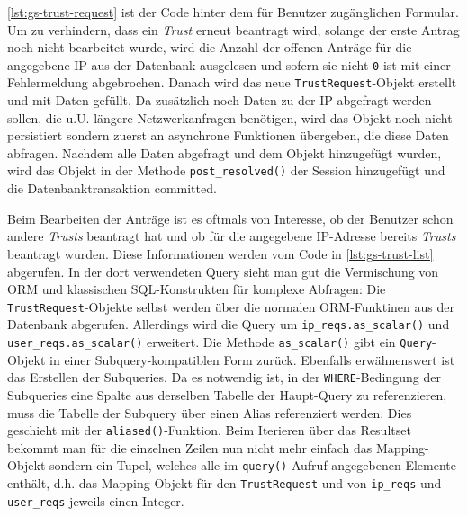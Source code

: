 \autoref{lst:gs-trust-request} ist der Code hinter dem für Benutzer zugänglichen
Formular. Um zu verhindern, dass ein \emph{Trust} erneut beantragt wird, solange
der erste Antrag noch nicht bearbeitet wurde, wird die Anzahl der offenen
Anträge für die angegebene IP aus der Datenbank ausgelesen und sofern sie nicht
\texttt{0} ist mit einer Fehlermeldung abgebrochen. Danach wird das neue
\texttt{TrustRequest}-Objekt erstellt und mit Daten gefüllt. Da zusätzlich noch
Daten zu der IP abgefragt werden sollen, die u.U. längere Netzwerkanfragen
benötigen, wird das Objekt noch nicht persistiert sondern zuerst an asynchrone
Funktionen übergeben, die diese Daten abfragen. Nachdem alle Daten abgefragt
und dem Objekt hinzugefügt wurden, wird das Objekt in der Methode
\texttt{post\_resolved()} der Session hinzugefügt und die Datenbanktransaktion
committed.



Beim Bearbeiten der Anträge ist es oftmals von Interesse, ob der Benutzer
schon andere \emph{Trusts} beantragt hat und ob für die angegebene IP-Adresse
bereits \emph{Trusts} beantragt wurden. Diese Informationen werden vom Code in
\autoref{lst:gs-trust-list} abgerufen. In der dort verwendeten Query sieht man
gut die Vermischung von ORM und klassischen SQL-Konstrukten für komplexe
Abfragen: Die \texttt{TrustRequest}-Objekte selbst werden über die normalen
ORM-Funktinen aus der Datenbank abgerufen. Allerdings wird die Query um
\texttt{ip\_reqs.as\_scalar()} und \texttt{user\_reqs.as\_scalar()} erweitert.
Die Methode \texttt{as\_scalar()} gibt ein \texttt{Query}-Objekt in einer
Subquery-kompatiblen Form zurück. Ebenfalls erwähnenswert ist das Erstellen der
Subqueries. Da es notwendig ist, in der \texttt{WHERE}-Bedingung der Subqueries
eine Spalte aus derselben Tabelle der Haupt-Query zu referenzieren, muss die
Tabelle der Subquery über einen Alias referenziert werden. Dies geschieht mit
der \texttt{aliased()}-Funktion.
Beim Iterieren über das Resultset bekommt man für die einzelnen Zeilen nun nicht
mehr einfach das Mapping-Objekt sondern ein Tupel, welches alle im
\texttt{query()}-Aufruf angegebenen Elemente enthält, d.h. das Mapping-Objekt
für den \texttt{TrustRequest} und von \texttt{ip\_reqs} und \texttt{user\_reqs}
jeweils einen Integer.



